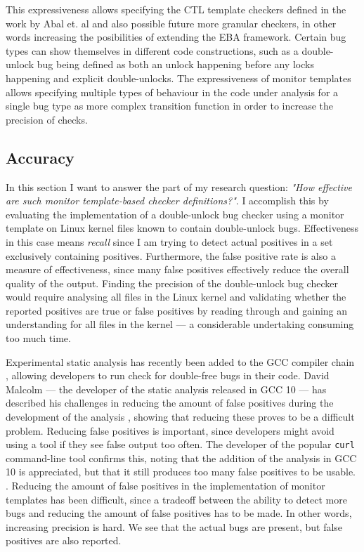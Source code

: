 \newpar This expressiveness allows specifying the CTL template checkers defined in the work by Abal et. al and also possible future more granular checkers, in other words increasing the posibilities of extending the EBA framework. Certain bug types can show themselves in different code constructions, such as a double-unlock bug being defined as both an unlock happening before any locks happening and explicit double-unlocks. The expressiveness of monitor templates allows specifying multiple types of behaviour in the code under analysis for a single bug type as more complex transition function in order to increase the precision of checks.

\subsection{Accuracy}

In this section I want to answer the part of my research question: \textit{"How effective are such monitor template-based checker definitions?"}. I accomplish this by evaluating the implementation of a double-unlock bug checker using a monitor template on Linux kernel files known to contain double-unlock bugs. Effectiveness in this case means \textit{recall} since I am trying to detect actual positives in a set exclusively containing positives. Furthermore, the false positive rate is also a measure of effectiveness, since many false positives effectively reduce the overall quality of the output. Finding the precision of the double-unlock bug checker would require analysing all files in the Linux kernel and validating whether the reported positives are true or false positives by reading through and gaining an understanding for all files in the kernel --- a considerable undertaking consuming too much time.

\newpar Experimental static analysis has recently been added to the GCC compiler chain \cite{gcc10}, allowing developers to run check for double-free bugs in their code. David Malcolm --- the developer of the static analysis released in GCC 10 --- has described his challenges in reducing the amount of false positives during the development of the analysis \cite{gcc10-development}, showing that reducing these proves to be a difficult problem. Reducing false positives is important, since developers might avoid using a tool if they see false output too often. The developer of the popular \texttt{curl} command-line tool confirms this, noting that the addition of the analysis in GCC 10 is appreciated, but that it still produces too many false positives to be usable. \cite{curl-static-analysis}. Reducing the amount of false positives in the implementation of monitor templates has been difficult, since a tradeoff between the ability to detect more bugs and reducing the amount of false positives has to be made. In other words, increasing precision is hard. We see that the actual bugs are present, but false positives are also reported. 

